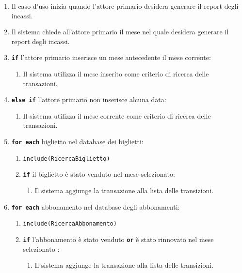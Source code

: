 \documentclass{article}
\begin{document}
		\begin{enumerate}[itemsep=8pt,parsep=0pt]
		
		\item Il caso d’uso inizia quando l’attore primario desidera generare il report degli incassi.
		\item Il sistema chiede all'attore primario il mese nel quale desidera generare il report degli incassi.
		\item \texttt{\textbf{if}} l'attore primario inserisce un mese antecedente il mese corrente:
			\begin{enumerate}	[leftmargin=28pt]
				\item Il sistema utilizza il mese inserito come criterio di ricerca delle transazioni.
  			\end{enumerate}	
		\item \texttt{\textbf{else if}} l'attore primario non inserisce alcuna data:
			\begin{enumerate}	[leftmargin=28pt]
				\item Il sistema utilizza il mese corrente come criterio di ricerca delle transazioni.
  			\end{enumerate}

		\item \texttt{\textbf{for each}} biglietto nel database dei biglietti:
		    \begin{enumerate}	[leftmargin=28pt]
				\item \texttt{{include(RicercaBiglietto)}}
				\item \texttt{\textbf{if}} il biglietto è stato venduto nel mese selezionato:
					\begin{enumerate}	[leftmargin=28pt]
						\item Il sistema aggiunge la transazione alla lista delle transizioni.
		  			\end{enumerate}	
  		    \end{enumerate}

		\item \texttt{\textbf{for each}} abbonamento nel database degli abbonamenti:
		    \begin{enumerate}	[leftmargin=28pt]
				\item \texttt{{include(RicercaAbbonamento)}}
				\item \texttt{\textbf{if}} l'abbonamento è stato venduto \texttt{\textbf{or}} è stato rinnovato nel mese selezionato :
					\begin{enumerate}	[leftmargin=28pt]
						\item Il sistema aggiunge la transazione alla lista delle transizioni.
		  			\end{enumerate}	
  		    \end{enumerate}


\end{enumerate}
\end{document}
